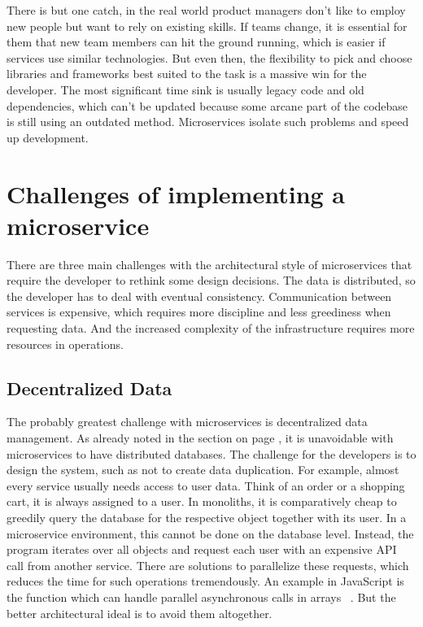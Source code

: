 There is but one catch, in the real world product managers don't like to employ new people but want to rely on existing skills. If teams change, it is essential for them that new team members can hit the ground running, which is easier if services use similar technologies. But even then, the flexibility to pick and choose libraries and frameworks best suited to the task is a massive win for the developer. The most significant time sink is usually legacy code and old dependencies, which can't be updated because some arcane part of the codebase is still using an outdated method. Microservices isolate such problems and speed up development.


\section{Challenges of implementing a microservice}

There are three main challenges with the architectural style of microservices that require the developer to rethink some design decisions. The data is distributed, so the developer has to deal with eventual consistency. Communication between services is expensive, which requires more discipline and less greediness when requesting data. And the increased complexity of the infrastructure requires more resources in operations.


\subsection{Decentralized Data}
\label{sec:theory:challenges:data}

The probably greatest challenge with microservices is decentralized data management. As already noted in the section on page \pageref{sec:theory:decentralized-data}, it is unavoidable with microservices to have distributed databases. The challenge for the developers is to design the system, such as not to create data duplication. For example, almost every service usually needs access to user data. Think of an order or a shopping cart, it is always assigned to a user. In monoliths, it is comparatively cheap to greedily query the database for the respective object together with its user. In a microservice environment, this cannot be done on the database level. Instead, the program iterates over all objects and request each user with an expensive API call from another service. There are solutions to parallelize these requests, which reduces the time for such operations tremendously. An example in JavaScript is the  function which can handle parallel asynchronous calls in arrays ~\cite{mdn.2020}. But the better architectural ideal is to avoid them altogether.

